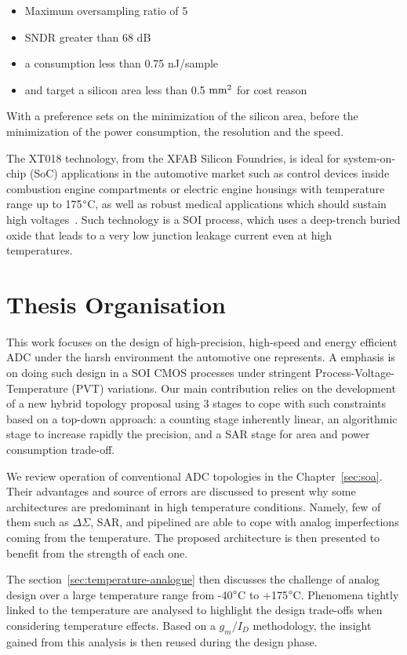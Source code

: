 \begin{itemize}
	\item Maximum oversampling ratio of 5
	\item SNDR greater than 68 dB
	\item a consumption less than 0.75 nJ/sample
	\item and target a silicon area less than 0.5 \(\rm mm^2 \) for cost reason
\end{itemize}
 
With a preference sets on the minimization of the silicon area, before the minimization of the power consumption, the resolution and the speed.

The XT018 technology, from the XFAB Silicon Foundries, is ideal for system-on-chip (SoC) applications in the automotive market such as control devices inside combustion engine compartments or electric engine housings with temperature range up to 175$\degree$C, as well as robust medical applications which should sustain high voltages~\cite{XT018XFab}. Such technology is a SOI process, which uses a deep-trench buried oxide that leads to a very low junction leakage current even at high temperatures.

\section{Thesis Organisation}

This work focuses on the design of high-precision, high-speed and energy efficient ADC under the harsh environment the automotive one represents. A emphasis is on doing such design in a SOI CMOS processes under stringent Process-Voltage-Temperature (PVT) variations. Our main contribution relies on the development of a new hybrid topology proposal using 3 stages to cope with such constraints based on a top-down approach: a counting stage inherently linear, an algorithmic stage to increase rapidly the precision, and a SAR stage for area and power consumption trade-off.

We review operation of conventional ADC topologies in the Chapter~\ref{sec:soa}. Their advantages and source of errors are discussed to present why some architectures are predominant in high temperature conditions. Namely, few of them such as \(\Delta \Sigma\), SAR, and pipelined are able to cope with analog imperfections coming from the temperature. The proposed architecture is then presented to benefit from the strength of each one.

The section~\ref{sec:temperature-analogue} then discusses the challenge of analog design over a large temperature range from -40\(\degree\)C to +175\(\degree\)C. Phenomena tightly linked to the temperature are analysed to highlight the design trade-offs when considering temperature effects. Based on a \(g_m/I_D\) methodology, the insight gained from this analysis is then reused during the design phase.

